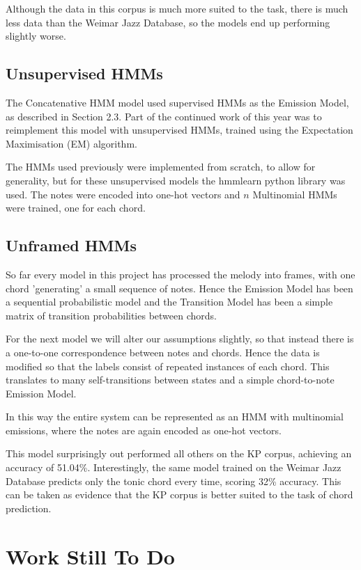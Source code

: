 \documentclass[bsc,singlespacing,parskip, deptreport]{infthesis}
\begin{document}
Although the data in this corpus is much more suited to the task, there is much less data than the Weimar Jazz Database, so the models end up performing slightly worse. 
 
\subsection{Unsupervised HMMs}

The Concatenative HMM model used supervised HMMs as the Emission Model, as described in Section 2.3. Part of the continued work of this year was to reimplement this model with unsupervised HMMs, trained using the Expectation Maximisation (EM) algorithm. 

The HMMs used previously were implemented from scratch, to allow for generality, but for these unsupervised models the hmmlearn python library was used. The notes were encoded into one-hot vectors and $n$ Multinomial HMMs were trained, one for each chord.



\subsection{Unframed HMMs}

So far every model in this project has processed the melody into frames, with one chord 'generating' a small sequence of notes. Hence the Emission Model has been a sequential probabilistic model and the Transition Model has been a simple matrix of transition probabilities between chords.

For the next model we will alter our assumptions slightly, so that instead there is a one-to-one correspondence between notes and chords. Hence the data is modified so that the labels consist of repeated instances of each chord. This translates to many self-transitions between states and a simple chord-to-note Emission Model.

In this way the entire system can be represented as an HMM with multinomial emissions, where the notes are again encoded as one-hot vectors.

This model surprisingly out performed all others on the KP corpus, achieving an accuracy of 51.04\%. Interestingly, the same model trained on the Weimar Jazz Database predicts only the tonic chord every time, scoring 32\% accuracy. This can be taken as evidence that the KP corpus is better suited to the task of chord prediction. 

\section{Work Still To Do}
\end{document}

